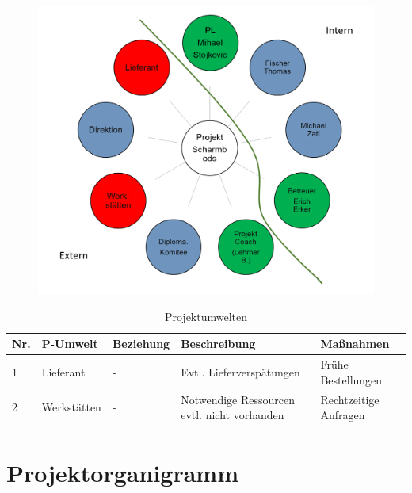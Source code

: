 \begin{figure}[htbp]
    \centering
    \includegraphics[width=\textwidth]{img/Projektumweltanalyse.png} 
    \caption{}
\end{figure}

\begin{table}[H]
    \centering
    \begin{tabular}{|l|l|l|p{4.5cm}|l|}
        \hline
        \textbf{Nr.} & \textbf{P-Umwelt} & \textbf{Beziehung} & \textbf{Beschreibung} & \textbf{Maßnahmen} \\
        \hline
        1 & Lieferant & - & Evtl. Lieferverspätungen & Frühe Bestellungen \\
        \hline
        2 & Werkstätten & - & Notwendige Ressourcen evtl. nicht vorhanden & Rechtzeitige Anfragen \\
        \hline
    \end{tabular}
    \caption{Projektumwelten}
    \label{tab:projektumwelten}
\end{table}

\newpage

\section{Projektorganigramm}

